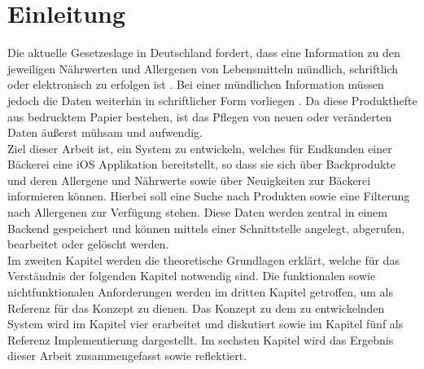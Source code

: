 \chapter{Einleitung}
Die aktuelle Gesetzeslage in Deutschland fordert, dass eine Information zu den jeweiligen Nährwerten und Allergenen von Lebensmitteln mündlich, schriftlich oder elektronisch zu erfolgen ist \cite{bmel}. Bei einer mündlichen Information müssen jedoch die Daten weiterhin in schriftlicher Form vorliegen \cite{bmel}. Da diese Produkthefte aus bedrucktem Papier bestehen, ist das Pflegen von neuen oder veränderten Daten äußerst mühsam und aufwendig.
\\
Ziel dieser Arbeit ist, ein System zu entwickeln, welches für Endkunden einer Bäckerei eine iOS Applikation bereitstellt, so dass sie sich über Backprodukte und deren Allergene und Nährwerte sowie über Neuigkeiten zur Bäckerei informieren können. Hierbei soll eine Suche nach Produkten sowie eine Filterung nach Allergenen zur Verfügung stehen. Diese Daten werden zentral in einem Backend gespeichert und können mittels einer Schnittstelle angelegt, abgerufen, bearbeitet oder gelöscht werden.
\\
Im zweiten Kapitel werden die theoretische Grundlagen erklärt, welche für das Verständnis der folgenden Kapitel notwendig sind.
Die funktionalen sowie nichtfunktionalen Anforderungen werden im dritten Kapitel getroffen, um als Referenz für das Konzept zu dienen. Das Konzept zu dem zu entwickelnden System wird im Kapitel vier erarbeitet und diskutiert sowie im Kapitel fünf als Referenz Implementierung dargestellt. Im sechsten Kapitel wird das Ergebnis dieser Arbeit zusammengefasst sowie reflektiert.